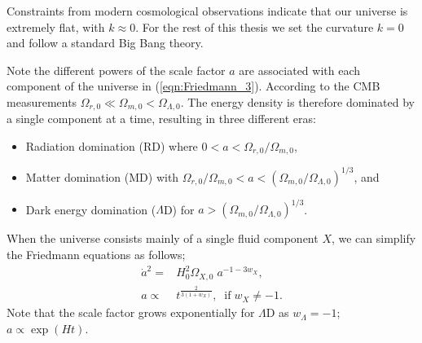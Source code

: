 Constraints from modern cosmological observations indicate that our universe is extremely flat, with $k\approx 0$. For the rest of this thesis we set the curvature $k=0$ and follow a standard Big Bang theory.

Note the different powers of the scale factor $a$ are associated with each component of the universe in (\ref{eqn:Friedmann_3}). According to the CMB measurements $\Omega_{r,0} \ll \Omega_{m,0} < \Omega_{\Lambda,0}$. The energy density is therefore dominated by a single component at a time, resulting in three different eras:
\begin{itemize}
	\item Radiation domination (RD) where $0 < a < \Omega_{r,0}/\Omega_{m,0}$,
	\item Matter domination (MD) with $\Omega_{r,0}/\Omega_{m,0} < a < (\Omega_{m,0}/\Omega_{\Lambda,0})^{1/3}$, and
	\item Dark energy domination ($\Lambda$D) for $a > (\Omega_{m,0}/\Omega_{\Lambda,0})^{1/3}$.
\end{itemize}
When the universe consists mainly of a single fluid component $X$, we can simplify the Friedmann equations as follows;
\begin{align}
	\dot{a}^2 =& H_0^2 \Omega_{X,0} \; a^{-1-3w_X}, \label{eqn:Friedmann_single_fluid}\\
	a \propto& t^\frac{2}{3(1+w_X)}, \;\; \text{if} \; w_X \neq -1.
\end{align}
Note that the scale factor grows exponentially for $\Lambda$D as $w_\Lambda=-1$; $a\propto \exp(Ht)$.

